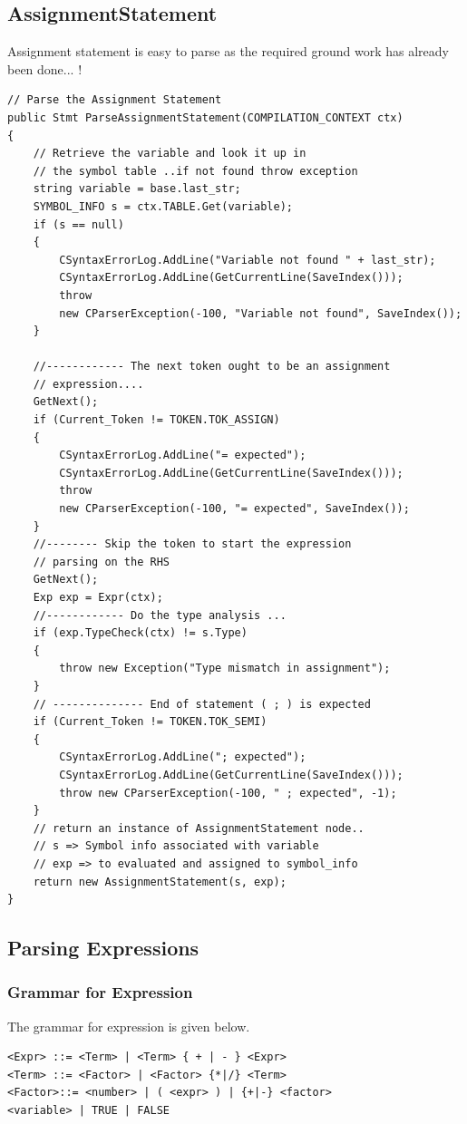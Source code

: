\subsection{AssignmentStatement}
Assignment statement is easy to parse as the required ground work has already been done... !
\lstset{style=csharp}
\begin{lstlisting}
// Parse the Assignment Statement
public Stmt ParseAssignmentStatement(COMPILATION_CONTEXT ctx)
{
	// Retrieve the variable and look it up in
	// the symbol table ..if not found throw exception
	string variable = base.last_str;
	SYMBOL_INFO s = ctx.TABLE.Get(variable);
	if (s == null)
	{
		CSyntaxErrorLog.AddLine("Variable not found " + last_str);
		CSyntaxErrorLog.AddLine(GetCurrentLine(SaveIndex()));
		throw 
		new CParserException(-100, "Variable not found", SaveIndex());
	}
 
	//------------ The next token ought to be an assignment
	// expression....
	GetNext();
	if (Current_Token != TOKEN.TOK_ASSIGN)
	{
		CSyntaxErrorLog.AddLine("= expected");
		CSyntaxErrorLog.AddLine(GetCurrentLine(SaveIndex()));
		throw 
		new CParserException(-100, "= expected", SaveIndex());
	}
	//-------- Skip the token to start the expression
	// parsing on the RHS
	GetNext();
	Exp exp = Expr(ctx);
	//------------ Do the type analysis ...
	if (exp.TypeCheck(ctx) != s.Type)
	{
		throw new Exception("Type mismatch in assignment");
	}
	// -------------- End of statement ( ; ) is expected
	if (Current_Token != TOKEN.TOK_SEMI)
	{
		CSyntaxErrorLog.AddLine("; expected");
		CSyntaxErrorLog.AddLine(GetCurrentLine(SaveIndex()));
		throw new CParserException(-100, " ; expected", -1);
	}
	// return an instance of AssignmentStatement node..
	// s => Symbol info associated with variable
	// exp => to evaluated and assigned to symbol_info
	return new AssignmentStatement(s, exp);
}
\end{lstlisting}
\subsection{Parsing Expressions}
\subsubsection{Grammar for Expression}
The grammar for expression is given below.
\lstset{style=csharp}
\begin{lstlisting}
<Expr> ::= <Term> | <Term> { + | - } <Expr>
<Term> ::= <Factor> | <Factor> {*|/} <Term>
<Factor>::= <number> | ( <expr> ) | {+|-} <factor>
<variable> | TRUE | FALSE
\end{lstlisting}
